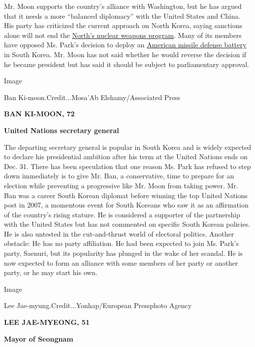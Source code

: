 Mr. Moon supports the country's alliance with Washington, but he has
argued that it needs a more ``balanced diplomacy'' with the United
States and China. His party has criticized the current approach on North
Korea, saying sanctions alone will not end the
\href{http://www.nytimes3xbfgragh.onion/topic/subject/north-koreas-nuclear-program}{North's
nuclear weapons program}. Many of its members have opposed Ms. Park's
decision to deploy an
\href{http://www.nytimes3xbfgragh.onion/2016/07/08/world/asia/south-korea-and-us-agree-to-deploy-missile-defense-system.html}{American
missile defense battery} in South Korea. Mr. Moon has not said whether
he would reverse the decision if he became president but has said it
should be subject to parliamentary approval.

Image

Ban Ki-moon.Credit...Mosa'Ab Elshamy/Associated Press

\textbf{BAN KI-MOON, 72}

\textbf{United Nations secretary general}

The departing secretary general is popular in South Korea and is widely
expected to declare his presidential ambition after his term at the
United Nations ends on Dec. 31. There has been speculation that one
reason Ms. Park has refused to step down immediately is to give Mr. Ban,
a conservative, time to prepare for an election while preventing a
progressive like Mr. Moon from taking power. Mr. Ban was a career South
Korean diplomat before winning the top United Nations post in 2007, a
momentous event for South Koreans who saw it as an affirmation of the
country's rising stature. He is considered a supporter of the
partnership with the United States but has not commented on specific
South Korean policies. He is also untested in the cut-and-thrust world
of electoral politics. Another obstacle: He has no party affiliation. He
had been expected to join Ms. Park's party, Saenuri, but its popularity
has plunged in the wake of her scandal. He is now expected to form an
alliance with some members of her party or another party, or he may
start his own.

Image

Lee Jae-myung.Credit...Yonhap/European Pressphoto Agency

\textbf{LEE JAE-MYEONG, 51}

\textbf{Mayor of Seongnam}

